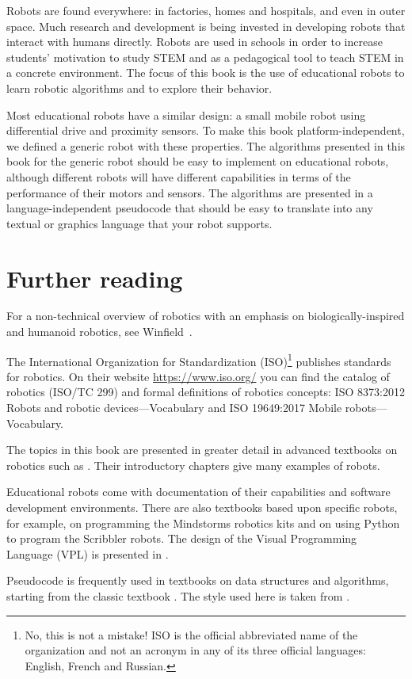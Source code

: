 Robots are found everywhere: in factories, homes and hospitals, and even in outer space. Much research and development is being invested in developing robots that interact with humans directly. Robots are used in schools in order to increase students' motivation to study STEM and as a pedagogical tool to teach STEM in a concrete environment. The focus of this book is the use of educational robots to learn robotic algorithms and to explore their behavior.

Most educational robots have a similar design: a small mobile robot using differential drive and proximity sensors. To make this book platform-independent, we defined a generic robot with these properties. The algorithms presented in this book for the generic robot should be easy to implement on educational robots, although different robots will have different capabilities in terms of the performance of their motors and sensors. The algorithms are presented in a language-independent pseudocode that should be easy to translate into any textual or graphics language that your robot supports.

\section{Further reading}

For a non-technical overview of robotics with an emphasis on biologically-inspired and humanoid robotics, see Winfield~\cite{vsi}.

The International Organization for Standardization (ISO)\footnote{No, this is not a mistake! ISO is the official abbreviated name of the organization and not an acronym in any of its three official languages: English, French and Russian.} publishes standards for robotics. On their website \url{https://www.iso.org/} you can find the catalog of robotics (ISO/TC 299) and formal definitions of robotics concepts: ISO 8373:2012 Robots and robotic devices---Vocabulary and ISO 19649:2017 Mobile robots---Vocabulary.

The topics in this book are presented in greater detail in advanced textbooks on robotics such as \cite{dudek,siegwart}. Their introductory chapters give many examples of robots.

Educational robots come with documentation of their capabilities and software development environments. There are also textbooks based upon specific robots, for example, \cite{trobaugh} on programming the \lego{} Mindstorms robotics kits and \cite{kumar} on using Python to program the Scribbler robots. The design of the Visual Programming Language (VPL) is presented in \cite{shin2014idc}.

Pseudocode is frequently used in textbooks on data structures and algorithms, starting from the classic textbook \cite{aho}. The style used here is taken from \cite{pcdp2}.



